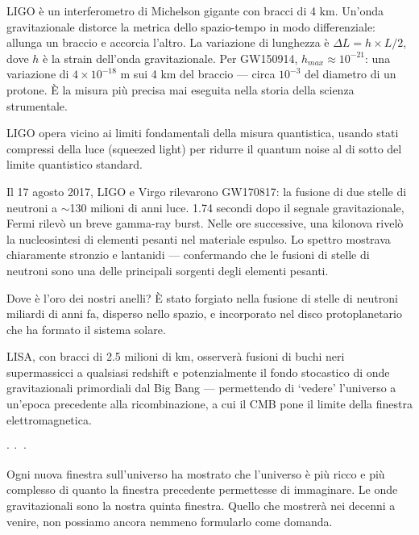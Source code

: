 \documentclass[12pt,a4paper,openany]{book}
\newcommand{\sezione}[1]{\vspace{1.2em}{\large\bfseries #1}\vspace{0.5em}\par}
\newcommand{\puntini}{\begin{center}$\cdot\ \cdot\ \cdot$\end{center}\vspace{0.3em}}
\begin{document}
\sezione{Come funziona LIGO}

LIGO è un interferometro di Michelson gigante con bracci di 4 km. Un'onda gravitazionale distorce la metrica dello spazio-tempo in modo differenziale: allunga un braccio e accorcia l'altro. La variazione di lunghezza è $\Delta L = h \times L/2$, dove $h$ è la strain dell'onda gravitazionale. Per GW150914, $h_{max} \approx 10^{-21}$: una variazione di $4 \times 10^{-18}$ m sui 4 km del braccio — circa $10^{-3}$ del diametro di un protone. È la misura più precisa mai eseguita nella storia della scienza strumentale.

LIGO opera vicino ai limiti fondamentali della misura quantistica, usando stati compressi della luce (squeezed light) per ridurre il quantum noise al di sotto del limite quantistico standard.

\sezione{GW170817: la prima astronomia multi-messaggera}

Il 17 agosto 2017, LIGO e Virgo rilevarono GW170817: la fusione di due stelle di neutroni a $\sim$130 milioni di anni luce. 1.74 secondi dopo il segnale gravitazionale, Fermi rilevò un breve gamma-ray burst. Nelle ore successive, una kilonova rivelò la nucleosintesi di elementi pesanti nel materiale espulso. Lo spettro mostrava chiaramente stronzio e lantanidi — confermando che le fusioni di stelle di neutroni sono una delle principali sorgenti degli elementi pesanti.

Dove è l'oro dei nostri anelli? È stato forgiato nella fusione di stelle di neutroni miliardi di anni fa, disperso nello spazio, e incorporato nel disco protoplanetario che ha formato il sistema solare.

\sezione{Il futuro: LISA e i segnali primordiali}

LISA, con bracci di 2.5 milioni di km, osserverà fusioni di buchi neri supermassicci a qualsiasi redshift e potenzialmente il fondo stocastico di onde gravitazionali primordiali dal Big Bang — permettendo di `vedere' l'universo a un'epoca precedente alla ricombinazione, a cui il CMB pone il limite della finestra elettromagnetica.

\puntini

Ogni nuova finestra sull'universo ha mostrato che l'universo è più ricco e più complesso di quanto la finestra precedente permettesse di immaginare. Le onde gravitazionali sono la nostra quinta finestra. Quello che mostrerà nei decenni a venire, non possiamo ancora nemmeno formularlo come domanda.

\end{document}

